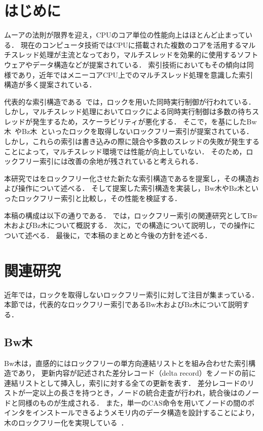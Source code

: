 
\section{はじめに}

ムーアの法則が限界を迎え，CPUのコア単位の性能向上はほとんど止まっている．
現在のコンピュータ技術ではCPUに搭載された複数のコアを活用するマルチスレッド処理が主流となっており，マルチスレッドを効果的に使用するソフトウェアやデータ構造などが提案されている．
索引技術においてもその傾向は同様であり，近年ではメニーコアCPU上でのマルチスレッド処理を意識した索引構造が多く提案されている．

代表的な索引構造である\Bptree{}~\cite{book:dbsystem}では，ロックを用いた同時実行制御が行われている．
しかし，マルチスレッド処理においてロックによる同時実行制御は多数の待ちスレッドが発生するため，スケーラビリティが悪化する．
そこで，\Bptree{}を基にしたBw木~\cite{book:Bwtree}やBz木~\cite{book:Bztree}といったロックを取得しないロックフリー索引が提案されている．
しかし，これらの索引は書き込みの際に競合や多数のスレッドの失敗が発生することによって，マルチスレッド環境では性能が向上していない．
そのため，ロックフリー索引には改善の余地が残されていると考えられる．

本研究では\Bptree{}をロックフリー化させた新たな索引構造である\Bctree{}を提案し，その構造および操作について述べる．
そして提案した索引構造を実装し，Bw木やBz木といったロックフリー索引と比較し，その性能を検証する．

本稿の構成は以下の通りである．
\Sec{\ref{sec:relatedwork}}では，ロックフリー索引の関連研究としてBw木およびBz木について概説する．
次に，\Sec{\ref{sec:bc_tree_structure}}で\Bctree{}の構造について説明し，\Sec{\ref{sec:bc_tree_operation}}で\Bctree{}の操作について述べる．
最後に，\Sec{\ref{sec:conclusion}}で本稿のまとめと今後の方針を述べる．

\section{関連研究}
\label{sec:relatedwork}

近年では，ロックを取得しないロックフリー索引に対して注目が集まっている．
本節では，代表的なロックフリー索引であるBw木およびBz木について説明する．

\subsection{Bw木}

Bw木は，直感的にはロックフリーの単方向連結リストと\Bptree{}を組み合わせた索引構造であり，%
更新内容が記述された差分レコード（delta record）をノードの前に連結リストとして挿入し，索引に対する全ての更新を表す．
差分レコードのリストが一定以上の長さを持つとき，ノードの統合走査が行われ，統合後は\Bptree{}のノードと同様のものが生成される．
また，単一のCAS命令を用いてノードの間のポインタをインストールできるようメモリ内のデータ構造を設計することにより，木のロックフリー化を実現している~\cite{book:DatabaseInternals}．

